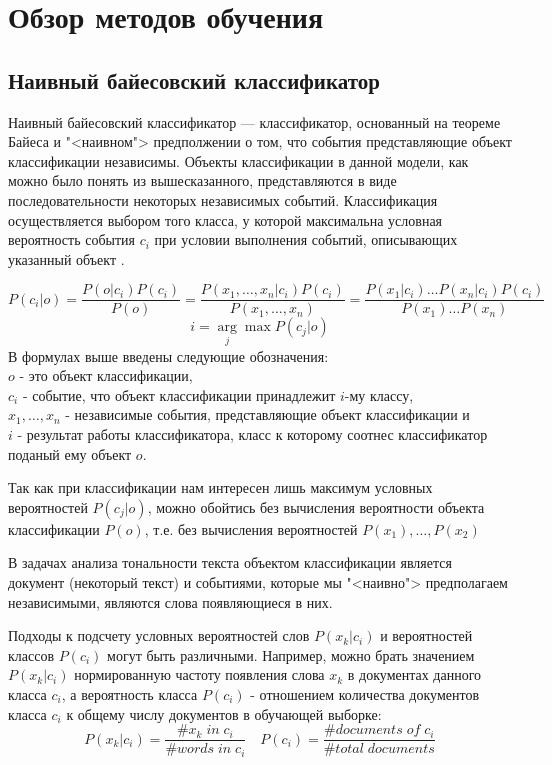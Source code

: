 \chapter{Обзор методов обучения}

\section{Наивный байесовский классификатор}
Наивный байесовский классификатор --- классификатор, основанный на теореме Байеса и "<наивном"> предполжении о том, что события представляющие объект классификации независимы. Объекты классификации в данной модели, как можно было понять из вышесказанного, представляются в виде последовательности некоторых независимых событий. Классификация осуществляется выбором того класса, у которой максимальна условная вероятность события $ c_i $ при условии выполнения событий, описывающих указанный объект \cite{irinaRish:naiveBayes}.

$$
P(c_i|o) = \frac{P(o | c_i)P(c_i)}{P(o)} =
\frac{P(x_1, \ldots , x_n|c_i)P(c_i)}{P(x_1, \ldots , x_n)} =
\frac{P(x_1|c_i)\ldots P(x_n|c_i)P(c_i)}{P(x_1) \ldots P(x_n)}
$$
$$
i = \arg\limits_{j}\max P(c_j|o)
$$
В формулах выше введены следующие обозначения: \\
$o$ - это объект классификации, \\ $c_i$ - событие, что объект классификации принадлежит $i$-му классу, \\ $x_1, \ldots, x_n$ - независимые события, представляющие объект классификации и \\ $i$ - результат работы классификатора, класс к которому соотнес классификатор поданый ему объект $o$.


Так как при классификации нам интересен лишь максимум условных вероятностей $ P(c_j | o) $, можно обойтись без вычисления вероятности объекта классификации $P(o)$, т.е. без вычисления вероятностей $P(x_1), \ldots, P(x_2)$

В задачах анализа тональности текста объектом классификации является документ (некоторый текст) и событиями, которые мы "<наивно"> предполагаем независимыми, являются слова появляющиеся в них.

Подходы к подсчету условных вероятностей слов $P(x_k|c_i)$ и вероятностей классов $P(c_i)$ могут быть различными. Например, можно брать значением $P(x_k|c_i)$ нормированную частоту появления слова $x_k$ в документах данного класса $c_i$, а вероятность класса $P(c_i)$ - отношением количества документов класса $c_i$ к общему числу документов в обучающей выборке:
$$
	P(x_k|c_i) = \frac{\# x_k \; in \; c_i}{\# words \; in \; c_i} \quad P(c_i) = \frac{\# documents \; of \; c_i}{\#total \; documents}
$$

